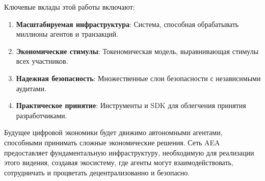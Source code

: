 \documentclass[12pt,a4paper]{article}
\begin{document}
Ключевые вклады этой работы включают:

\begin{enumerate}
\item \textbf{Масштабируемая инфраструктура}: Система, способная обрабатывать миллионы агентов и транзакций.
\item \textbf{Экономические стимулы}: Токеномическая модель, выравнивающая стимулы всех участников.
\item \textbf{Надежная безопасность}: Множественные слои безопасности с независимыми аудитами.
\item \textbf{Практическое принятие}: Инструменты и SDK для облегчения принятия разработчиками.
\end{enumerate}

Будущее цифровой экономики будет движимо автономными агентами, способными принимать сложные экономические решения. Сеть AEA предоставляет фундаментальную инфраструктуру, необходимую для реализации этого видения, создавая экосистему, где агенты могут взаимодействовать, сотрудничать и процветать децентрализованно и безопасно.
\end{document}
